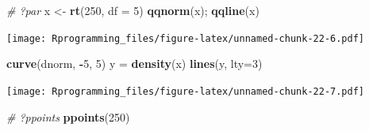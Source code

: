 \documentclass[10pt,]{krantz}
\makeatletter
\newenvironment{Shaded}{\begin{snugshade}}{\end{snugshade}}
\newcommand{\KeywordTok}[1]{\textcolor[rgb]{0.13,0.29,0.53}{\textbf{#1}}}
\newcommand{\DataTypeTok}[1]{\textcolor[rgb]{0.13,0.29,0.53}{#1}}
\newcommand{\DecValTok}[1]{\textcolor[rgb]{0.00,0.00,0.81}{#1}}
\newcommand{\StringTok}[1]{\textcolor[rgb]{0.31,0.60,0.02}{#1}}
\newcommand{\CommentTok}[1]{\textcolor[rgb]{0.56,0.35,0.01}{\textit{#1}}}
\newcommand{\OperatorTok}[1]{\textcolor[rgb]{0.81,0.36,0.00}{\textbf{#1}}}
\newcommand{\NormalTok}[1]{#1}
\newenvironment{kframe}{%
\medskip{}
\setlength{\fboxsep}{.8em}
 \def\at@end@of@kframe{}%
 \ifinner\ifhmode%
  \def\at@end@of@kframe{\end{minipage}}%
  \begin{minipage}{\columnwidth}%
 \fi\fi%
 \def\FrameCommand##1{\hskip\@totalleftmargin \hskip-\fboxsep
 \colorbox{shadecolor}{##1}\hskip-\fboxsep
     \hskip-\linewidth \hskip-\@totalleftmargin \hskip\columnwidth}%
 \MakeFramed {\advance\hsize-\width
   \@totalleftmargin\z@ \linewidth\hsize
   \@setminipage}}%
 {\par\unskip\endMakeFramed%
 \at@end@of@kframe}
\renewenvironment{Shaded}{\begin{kframe}}{\end{kframe}}
\makeatother
\begin{document}
\begin{Shaded}
\begin{Highlighting}[]
\CommentTok{# ?par}
\NormalTok{x <-}\StringTok{ }\KeywordTok{rt}\NormalTok{(}\DecValTok{250}\NormalTok{, }\DataTypeTok{df =} \DecValTok{5}\NormalTok{)}
\KeywordTok{qqnorm}\NormalTok{(x); }\KeywordTok{qqline}\NormalTok{(x)}
\end{Highlighting}
\end{Shaded}

\texttt{[image: Rprogramming\_files/figure-latex/unnamed-chunk-22-6.pdf]}

\begin{Shaded}
\begin{Highlighting}[]
\KeywordTok{curve}\NormalTok{(dnorm, }\OperatorTok{-}\DecValTok{5}\NormalTok{, }\DecValTok{5}\NormalTok{)}
\NormalTok{y =}\StringTok{ }\KeywordTok{density}\NormalTok{(x)}
\KeywordTok{lines}\NormalTok{(y, }\DataTypeTok{lty=}\DecValTok{3}\NormalTok{)}
\end{Highlighting}
\end{Shaded}

\texttt{[image: Rprogramming\_files/figure-latex/unnamed-chunk-22-7.pdf]}

\begin{Shaded}
\begin{Highlighting}[]
\CommentTok{# ?ppoints}
\KeywordTok{ppoints}\NormalTok{(}\DecValTok{250}\NormalTok{)}
\end{Highlighting}
\end{Shaded}
\end{document}
